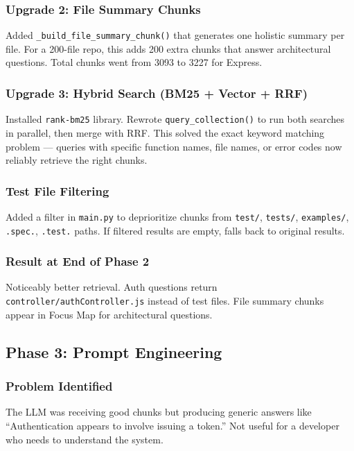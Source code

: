 \documentclass[a4paper,11pt]{article}
\begin{document}
\subsubsection{Upgrade 2: File Summary Chunks}
Added \texttt{\_build\_file\_summary\_chunk()} that generates one holistic summary per file. For a 200-file repo, this adds 200 extra chunks that answer architectural questions. Total chunks went from 3093 to 3227 for Express.

\subsubsection{Upgrade 3: Hybrid Search (BM25 + Vector + RRF)}
Installed \texttt{rank-bm25} library. Rewrote \texttt{query\_collection()} to run both searches in parallel, then merge with RRF. This solved the exact keyword matching problem --- queries with specific function names, file names, or error codes now reliably retrieve the right chunks.

\subsubsection{Test File Filtering}
Added a filter in \texttt{main.py} to deprioritize chunks from \texttt{test/}, \texttt{tests/}, \texttt{examples/}, \texttt{.spec.}, \texttt{.test.} paths. If filtered results are empty, falls back to original results.

\subsubsection{Result at End of Phase 2}
Noticeably better retrieval. Auth questions return \texttt{controller/authController.js} instead of test files. File summary chunks appear in Focus Map for architectural questions.

\subsection{Phase 3: Prompt Engineering}

\subsubsection{Problem Identified}
The LLM was receiving good chunks but producing generic answers like ``Authentication appears to involve issuing a token.'' Not useful for a developer who needs to understand the system.
\end{document}
